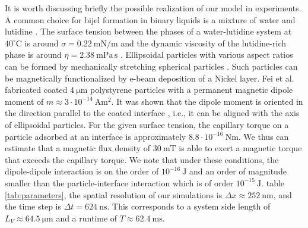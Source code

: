 It is worth discussing briefly the possible realization of our model in
experiments. A common choice for bijel formation in binary liquids is a
mixture of water and lutidine
\cite{clegg_emulsification_2007,herzig_bicontinuous_2007}. The surface
tension between the phases of a water-lutidine system at
\(40^\circ\mathrm{C}\) is around \(\sigma=0.22\ \mathrm{mN/m}\) and the
dynamic viscosity of the lutidine-rich phase is around
\(\eta=2.38\ \mathrm{mPa\,s}\) \cite{grattoni_lower_1993}. Ellipsoidal
particles with various aspect ratios can be formed by mechanically
stretching spherical particles \cite{trevenen_gradient_2021}. Such
particles can be magnetically functionalized by e-beam deposition of a
Nickel layer. Fei et
al.~\cite{fei_magneto-capillary_2018,fei_magneto-capillary_2020}
fabricated coated \(4\ \mathrm{\mu m}\) polystyrene particles with a
permanent magnetic dipole moment of
\(m\approx3\cdot10^{-14}\ \mathrm{Am^2}\). It was shown that the dipole moment is oriented in the direction parallel to the coated interface \cite{yan_linking_2012,yan_rotating_2014}, i.e., it can be aligned with the axis of ellipsoidal particles.
For the given surface tension, the capillary torque on a particle adsorbed at an interface is approximately
$8.8\cdot10^{-16}\ \mathrm{Nm}$. We thus can estimate that a magnetic
flux density of \(30\ \mathrm{mT}\) is able to exert a magnetic torque
that exceeds the capillary torque.
We note that under these conditions,
the dipole-dipole interaction is on the order of
\(10^{-16}\ \mathrm{J}\) and an order of magnitude smaller than the
particle-interface interaction which is of order
\(10^{-15}\ \mathrm{J}\). %
table \ref{tab:parameters}, the spatial resolution of our
simulations is $\Delta x\approx252\ \mathrm{nm}$, and the time step
is $\Delta t=624\ \mathrm{ns}$. This corresponds to a system side length of $L_V \approx 64.5\ \mathrm{\mu m}$ and a runtime of
$T \approx 62.4\ \mathrm{ms}$.

